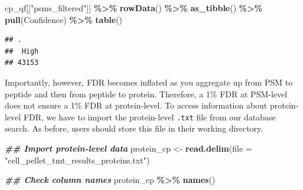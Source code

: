 \documentclass[9pt,a4paper,]{extarticle}
\newenvironment{Shaded}{\begin{snugshade}}{\end{snugshade}}
\newcommand{\AttributeTok}[1]{\textcolor[rgb]{0.13,0.29,0.53}{#1}}
\newcommand{\DocumentationTok}[1]{\textcolor[rgb]{0.56,0.35,0.01}{\textbf{\textit{#1}}}}
\newcommand{\FunctionTok}[1]{\textcolor[rgb]{0.13,0.29,0.53}{\textbf{#1}}}
\newcommand{\NormalTok}[1]{#1}
\newcommand{\OtherTok}[1]{\textcolor[rgb]{0.56,0.35,0.01}{#1}}
\newcommand{\SpecialCharTok}[1]{\textcolor[rgb]{0.81,0.36,0.00}{\textbf{#1}}}
\newcommand{\StringTok}[1]{\textcolor[rgb]{0.31,0.60,0.02}{#1}}
\begin{document}
\begin{Shaded}
\begin{Highlighting}[]
\NormalTok{cp\_qf[[}\StringTok{"psms\_filtered"}\NormalTok{]] }\SpecialCharTok{\%\textgreater{}\%}
  \FunctionTok{rowData}\NormalTok{() }\SpecialCharTok{\%\textgreater{}\%}
  \FunctionTok{as\_tibble}\NormalTok{() }\SpecialCharTok{\%\textgreater{}\%}
  \FunctionTok{pull}\NormalTok{(Confidence) }\SpecialCharTok{\%\textgreater{}\%}
  \FunctionTok{table}\NormalTok{()}
\end{Highlighting}
\end{Shaded}

\begin{verbatim}
## .
##  High 
## 43153
\end{verbatim}

Importantly, however, FDR becomes inflated as you aggregate up from PSM to
peptide and then from peptide to protein. Therefore, a 1\% FDR at PSM-level does
not ensure a 1\% FDR at protein-level. To access information about protein-level
FDR, we have to import the protein-level \texttt{.txt} file from our database search.
As before, users should store this file in their working directory.

\begin{Shaded}
\begin{Highlighting}[]
\DocumentationTok{\#\# Import protein{-}level data}
\NormalTok{protein\_cp }\OtherTok{\textless{}{-}} \FunctionTok{read.delim}\NormalTok{(}\AttributeTok{file =} \StringTok{"cell\_pellet\_tmt\_results\_proteins.txt"}\NormalTok{)}

\DocumentationTok{\#\# Check column names}
\NormalTok{protein\_cp }\SpecialCharTok{\%\textgreater{}\%}
  \FunctionTok{names}\NormalTok{()}
\end{Highlighting}
\end{Shaded}
\end{document}
